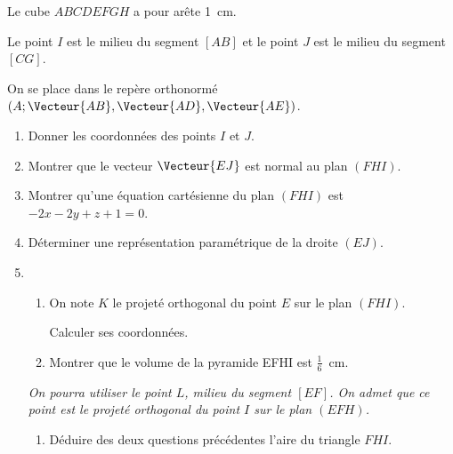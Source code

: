 Le cube $ABCDEFGH$ a pour arête 1~cm.

Le point $I$ est le milieu du segment $[AB]$ et le point $J$ est le milieu du segment $[CG]$.

\begin{Centrage}
	\begin{EnvTikzEspace}[UniteX={0:4cm},UniteZ={90:4cm},UniteY={65:2.4cm}]
		\PaveTikzTriDim[Cube,Largeur=1,AffLabel]
	\end{EnvTikzEspace}
\end{Centrage}

On se place dans le repère orthonormé $\left(A;\Vecteur{AB},\Vecteur{AD},\Vecteur{AE}\right)$.

\begin{enumerate}
	\item Donner les coordonnées des points $I$ et $J$.
	\item Montrer que le vecteur $\Vecteur{EJ}$ est normal au plan $(FHI)$.
	\item Montrer qu’une équation cartésienne du plan $(FHI)$ est $-2x-2y+z+1=0$.
	\item Déterminer une représentation paramétrique de la droite $(EJ)$.
	\item 
	\begin{enumerate}
		\item On note $K$ le projeté orthogonal du point $E$ sur le plan $(FHI)$.
		
		Calculer ses coordonnées.
		\item Montrer que le volume de la pyramide EFHI est $\frac16$~cm.
	\end{enumerate}
	\emph{On pourra utiliser le point $L$, milieu du segment $[EF]$. On admet que ce point est le projeté orthogonal du point $I$ sur le plan $(EFH)$.}
	\begin{enumerate}[resume]
		\item Déduire des deux questions précédentes l’aire du triangle $FHI$.
	\end{enumerate}
\end{enumerate}